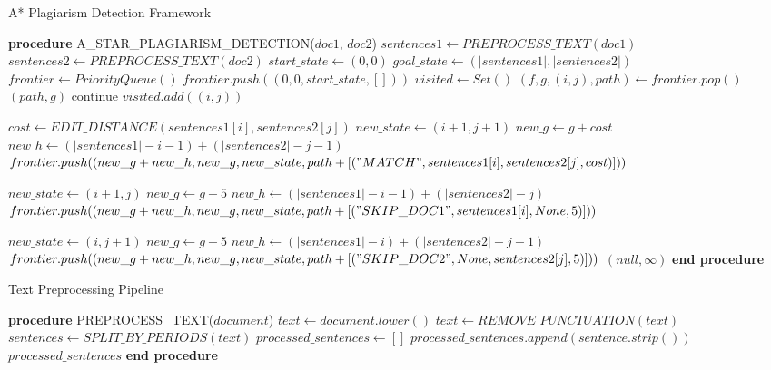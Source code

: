 \documentclass[conference]{IEEEtran}
\begin{document}
\begin{algorithm}
\caption{A* Plagiarism Detection Framework}
\begin{algorithmic}[1]
\STATE \textbf{procedure} A\_STAR\_PLAGIARISM\_DETECTION($doc1$, $doc2$)
\STATE $sentences1 \leftarrow PREPROCESS\_TEXT(doc1)$
\STATE $sentences2 \leftarrow PREPROCESS\_TEXT(doc2)$
\STATE $start\_state \leftarrow (0, 0)$ 
\STATE $goal\_state \leftarrow (|sentences1|, |sentences2|)$
\STATE $frontier \leftarrow PriorityQueue()$
\STATE $frontier.push((0, 0, start\_state, []))$ 
\STATE $visited \leftarrow Set()$
    \STATE $(f, g, (i,j), path) \leftarrow frontier.pop()$
        \RETURN $(path, g)$
    \ENDIF
        \STATE continue
    \ENDIF
    \STATE $visited.add((i,j))$
    
        \STATE $cost \leftarrow EDIT\_DISTANCE(sentences1[i], sentences2[j])$
        \STATE $new\_state \leftarrow (i+1, j+1)$
        \STATE $new\_g \leftarrow g + cost$
        \STATE $new\_h \leftarrow (|sentences1|-i-1) + (|sentences2|-j-1)$
        \STATE $frontier.push((new\_g+new\_h, new\_g, new\_state, path + [("MATCH", sentences1[i], sentences2[j], cost)]))$
    \ENDIF

        \STATE $new\_state \leftarrow (i+1, j)$
        \STATE $new\_g \leftarrow g + 5$
        \STATE $new\_h \leftarrow (|sentences1|-i-1) + (|sentences2|-j)$
        \STATE $frontier.push((new\_g+new\_h, new\_g, new\_state, path + [("SKIP\_DOC1", sentences1[i], None, 5)]))$
    \ENDIF

        \STATE $new\_state \leftarrow (i, j+1)$
        \STATE $new\_g \leftarrow g + 5$
        \STATE $new\_h \leftarrow (|sentences1|-i) + (|sentences2|-j-1)$
        \STATE $frontier.push((new\_g+new\_h, new\_g, new\_state, path + [("SKIP\_DOC2", None, sentences2[j], 5)]))$
    \ENDIF
\ENDWHILE
\RETURN $(null, \infty)$ 
\STATE \textbf{end procedure}
\end{algorithmic}
\end{algorithm}



\begin{algorithm}
\caption{Text Preprocessing Pipeline}
\begin{algorithmic}[1]
\STATE \textbf{procedure} PREPROCESS\_TEXT($document$)
\STATE $text \leftarrow document.lower()$
\STATE $text \leftarrow REMOVE\_PUNCTUATION(text)$ 
\STATE $sentences \leftarrow SPLIT\_BY\_PERIODS(text)$
\STATE $processed\_sentences \leftarrow []$
        \STATE $processed\_sentences.append(sentence.strip())$
    \ENDIF
\ENDFOR
\RETURN $processed\_sentences$
\STATE \textbf{end procedure}
\end{algorithmic}
\end{algorithm}
\end{document}
